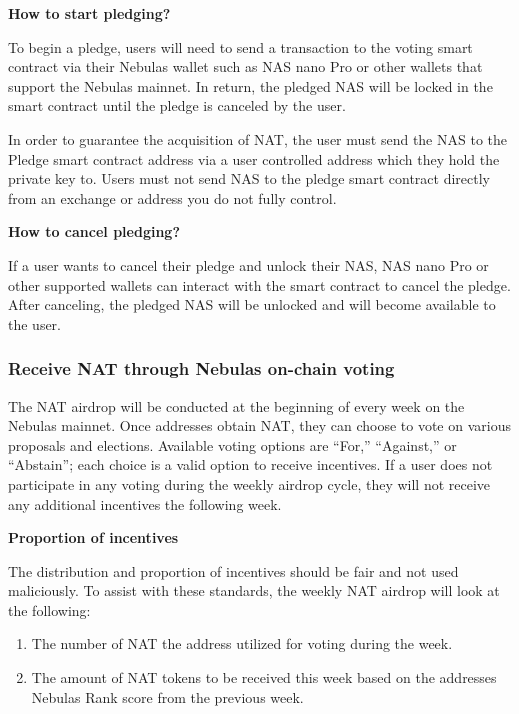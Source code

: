 \vspace{2em}

\textbf{How to start pledging?} 
	
To begin a pledge, users will need to send a transaction to the voting smart contract via their Nebulas wallet such as NAS nano Pro or other wallets that support the Nebulas mainnet. In return, the pledged NAS will be locked in the smart contract until the pledge is canceled by the user.

In order to guarantee the acquisition of NAT, the user must send the NAS to the Pledge smart contract address via a user controlled address which they hold the private key to. Users must not send NAS to the pledge smart contract directly from an exchange or address you do not fully control.

\vspace{2em}

\textbf{How to cancel pledging?}

If a user wants to cancel their pledge and unlock their NAS, NAS nano Pro or other supported wallets can interact with the smart contract to cancel the pledge. After canceling, the pledged NAS will be unlocked and will become available to the user.

\subsubsection{Receive NAT through Nebulas on-chain voting}

The NAT airdrop will be conducted at the beginning of every week on the Nebulas mainnet. Once addresses obtain NAT, they can choose to vote on various proposals and elections. Available voting options are “For,” “Against,” or “Abstain”; each choice is a valid option to receive incentives. If a user does not participate in any voting during the weekly airdrop cycle, they will not receive any additional incentives the following week.

\vspace{2em}

\textbf{Proportion of incentives}

The distribution and proportion of incentives should be fair and not used maliciously. To assist with these standards, the weekly NAT airdrop will look at the following:

\begin{enumerate}
	\item The number of NAT the address utilized for voting during the week.
	\item The amount of NAT tokens to be received this week based on the addresses Nebulas Rank score from the previous week.
\end{enumerate}

